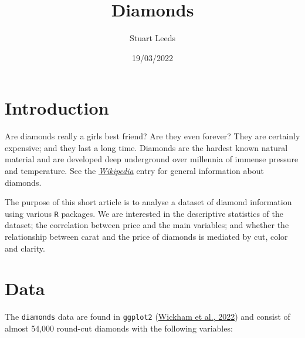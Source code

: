 \documentclass[
]{article}
\title{Diamonds}
\author{Stuart Leeds}
\date{19/03/2022}
\begin{document}
\maketitle

\hypertarget{introduction}{%
\section{Introduction}\label{introduction}}

Are diamonds really a girls best friend? Are they even forever? They are
certainly expensive; and they last a long time. Diamonds are the hardest
known natural material and are developed deep underground over millennia
of immense pressure and temperature. See the
\href{https://en.wikipedia.org/w/index.php?title=Diamond\&oldid=1073530080}{\emph{Wikipedia}}
entry for general information about diamonds.

The purpose of this short article is to analyse a dataset of diamond
information using various \texttt{R} packages. We are interested in the
descriptive statistics of the dataset; the correlation between price and
the main variables; and whether the relationship between carat and the
price of diamonds is mediated by cut, color and clarity.

\hypertarget{data}{%
\section{Data}\label{data}}

The \texttt{diamonds} data are found in \texttt{ggplot2}
(\protect\hyperlink{ref-R-ggplot2}{Wickham et al., 2022}) and consist of
almost 54,000 round-cut diamonds with the following variables:
\end{document}
